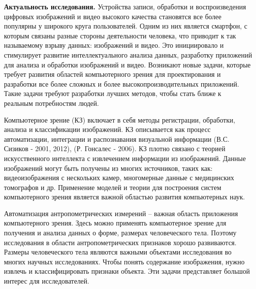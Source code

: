 
\textbf{Актуальность исследования.}
Устройства записи, обработки и воспроизведения цифровых изображений и видео высокого качества становятся все более популярны у широкого круга пользователей. Одним из них является смартфон, с которым связаны разные стороны деятельности человека, что приводит к так называемому взрыву данных: изображений и видео. Это инициировало и стимулирует развитие интеллектуального анализа данных, разработку приложений для анализа и обработки изображений и видео. Возникают новые задачи, которые требует развития областей компьютерного зрения для проектирования и разработки все более сложных и более высокопроизводительных приложений. Такие задачи требуют разработки лучших методов, чтобы стать ближе к реальным потребностям людей.

Компьютерное зрение (КЗ) включает в себя методы регистрации, обработки, анализа и классификации изображений. КЗ описывается как процесс автоматизации, интеграции и распознавания визуальной информации (В.С. Сизиков - 2001, 2012), (Р. Гонсалес - 2006). КЗ плотно связано с теорией искусственного интеллекта с извлечением информации из изображений. Данные изображений могут быть получены из многих источников, таких как: видеоизображения с нескольких камер, многомерные данные с медицинских томографов и др. Применение моделей и теории для построения систем компьютерного зрения является важной областью развития компьютерных наук.

Автоматизация антропометрических измерений – важная область приложения компьютерного зрения. Здесь можно применять компьютерное зрение для получения и анализа данных о форме, размерах человеческого тела. Поэтому исследования в области антропометрических признаков хорошо развиваются. Размеры человеческого тела являются важными объектами исследования во многих научных исследованиях. Чтобы понять содержание изображения, нужно извлечь и классифицировать признаки объекта. Эти задачи представляет большой интерес для исследователей.

